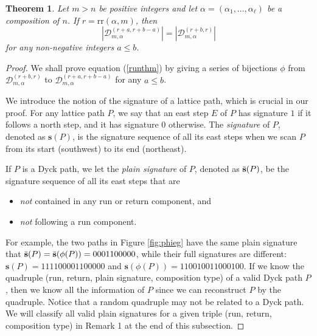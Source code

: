 \documentclass[11pt,a4paper,reqno]{article}
\newtheorem{thm}{Theorem}[section]
\newcommand{\fref}[1]{Figure \ref{fig:#1}}
\newcommand{\DD}{\mathcal{D}}
\newcommand{\rr}{\mathrm{rr}}
\newcommand{\al}{\alpha}
\newcommand{\psig}{\Bar{\mathbf{s}}}
\newcommand{\sig}{\mathbf{s}}
\newcommand{\LiLan}{}
\begin{document}
{	\begin{thm}\label{theorem:run2}
		Let $m>n$ be positive integers and let $\al = (\al_1,\ldots,\al_\ell)$ be a composition of $n$. If $r=\rr(\al,m)$, then
		\begin{equation}\label{runthm}
			\left|\DD_{m,\al}^{(r+a,r+b-a)}\right| = \left|\DD_{m,\al}^{(r+b,r)}\right|
		\end{equation}
		for any non-negative integers $a\leq b$.
	\end{thm}
	\begin{proof}
		We shall prove equation (\ref{runthm}) by giving a series of bijections $\phi$ from $\DD_{m,\al}^{(r+b,r)}$ to $\DD_{m,\al}^{(r+a,r+b-a)}$ for any $a\leq b$.
        
		We introduce the notion of the signature of a lattice path, which is crucial in our proof. For any lattice path $P$, we say that an east step $E$ of $P$ has signature $1$ if it follows a north step, and it has signature $0$ otherwise. The \textit{signature} of $P$, denoted as $\sig(P)$, is the signature sequence of all its east steps when we scan $P$ from its start (southwest) to its end (northeast).
        
        {\LiLan If $P$ is a Dyck path, we let the \textit{plain signature} of $P$, denoted as $\psig(P)$, be the signature sequence of all its east steps
        that are 
        \begin{itemize}
			\item \textit{not} contained in any run or return component, and
			\item \textit{not} following a run component.
		\end{itemize}
        }
       {\LiLan \noindent For example, the two paths in \fref{phieg} have the same plain signature that $\psig(P)=\psig(\phi(P))=0001100000$, while their full signatures are different: $\sig(P)=111100001100000$ and $\sig(\phi(P))=110010011000100$.}
If we know the quadruple (run, return, {\LiLan plain} signature, composition type) of a valid Dyck path $P$, then we know all the information of $P$ since we can reconstruct $P$ by the quadruple. Notice that a random quadruple may not be related to a Dyck path. We will classify all valid {\LiLan plain} signatures for a given triple (run, return, composition type) in Remark 1 at the end of this subsection.
        

\end{proof}}
\end{document}
